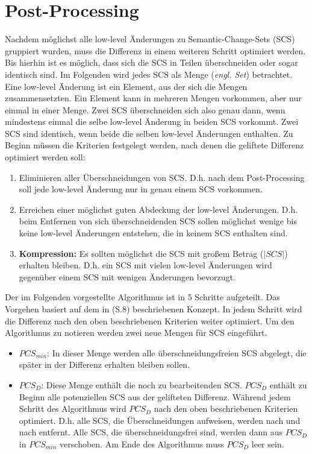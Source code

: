 \chapter{Post-Processing}
\label{post_processing}

Nachdem möglichst alle low-level Änderungen zu Semantic-Change-Sets (SCS)  gruppiert wurden, muss
die Differenz in einem weiteren Schritt optimiert werden. Bis hierhin ist es möglich, dass sich die
SCS in Teilen überschneiden oder sogar identisch sind. Im Folgenden wird jedes SCS als Menge
(\textit{engl. Set}) betrachtet. Eine low-level Änderung ist ein Element, aus der sich die Mengen
zusammensetzten. Ein Element kann in mehreren Mengen vorkommen, aber nur einmal in einer Menge. Zwei
SCS überschneiden sich also genau dann, wenn mindestens einmal die selbe low-level Änderung in
beiden SCS vorkommt. Zwei SCS sind identisch, wenn beide die selben low-level Änderungen enthalten.
Zu Beginn müssen die Kriterien festgelegt werden, nach denen die geliftete Differenz optimiert
werden soll:

\begin{enumerate}
  \item Eliminieren aller Überschneidungen von SCS. D.h. nach dem Post-Processing soll jede
  low-level Änderung nur in genau einem SCS vorkommen.
 
  \item Erreichen einer möglichst guten Abdeckung der low-level Änderungen. D.h. beim Entfernen von
  sich überschneidenden SCS sollen möglichst wenige bis keine low-level Änderungen entstehen, die in
  keinem SCS enthalten sind.

  \item \textbf{Kompression:} Es sollten möglichst die SCS mit großem Betrag ($|SCS|$) erhalten
  bleiben. D.h. ein SCS mit vielen low-level Änderungen wird gegenüber einem SCS mit wenigen
  Änderungen bevorzugt.
\end{enumerate}
Der im Folgenden vorgestellte Algorithmus ist in 5  Schritte aufgeteilt. Das Vorgehen basiert
auf dem in \cite{KeKT2011ASE} (S.8) beschriebenen Konzept. In jedem Schritt wird die Differenz nach
den oben beschriebenen Kriterien weiter optimiert. Um den Algorithmus zu notieren werden zwei neue
Mengen für SCS eingeführt.

\begin{itemize}
  \item $PCS_{min}$: In dieser Menge werden alle überschneidungsfreien SCS abgelegt, die später in
  der Differenz erhalten bleiben sollen.
 
  \item $PCS_D$: Diese Menge enthält die noch zu bearbeitenden SCS. $PCS_D$ enthält zu Beginn alle
  potenziellen SCS aus der gelifteten Differenz. Während jedem Schritt des Algorithmus wird $PCS_D$
  nach den oben beschriebenen Kriterien optimiert. D.h. alle SCS, die Überschneidungen aufweisen,
  werden nach und nach entfernt. Alle SCS, die überschneidungsfrei sind, werden dann aus $PCS_D$ in
  $PCS_{min}$ verschoben. Am Ende des Algorithmus muss $PCS_D$ leer sein.
\end{itemize}

